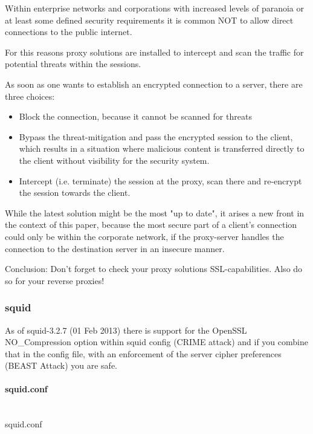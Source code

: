 
Within enterprise networks and corporations with increased levels of paranoia or at least some defined security requirements it is common NOT to allow direct connections to the public internet.

For this reasons proxy solutions are installed to intercept and scan the traffic for potential threats within the sessions.

As soon as one wants to establish an encrypted connection to a server, there are three choices:

\begin{itemize}
\item Block the connection, because it cannot be scanned for threats
\item Bypass the threat-mitigation and pass the encrypted session to the client, which results in a situation where malicious content is transferred directly to the client without visibility for the security system.
\item Intercept (i.e. terminate) the session at the proxy, scan there and re-encrypt the session towards the client.
\end{itemize}

While the latest solution might be the most "up to date", it arises a new front in the context of this paper, because the most secure part of a client's connection could only be within the corporate network, if the proxy-server handles the connection to the destination server in an insecure manner.

Conclusion: Don't forget to check your proxy solutions SSL-capabilities. Also do so for your reverse proxies!

\subsubsection{squid}


As of squid-3.2.7 (01 Feb 2013) there is support for the OpenSSL NO\_Compression option within squid config (CRIME attack) and if you combine that in the config file, with an enforcement of the server cipher preferences (BEAST Attack) you are safe.

\paragraph*{squid.conf}\mbox{}\\
squid.conf

